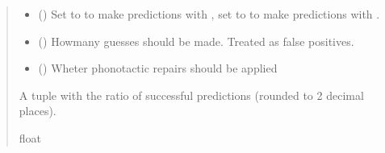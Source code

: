 \documentclass[letterpaper,10pt,english]{sphinxmanual}
\begin{document}
\begin{fulllineitems}
\begin{quote}
\begin{description}
\begin{itemize}
\item {} 
\sphinxAtStartPar
{} () \textendash{} Set to  to make predictions with
, set to  to
make predictions with
.

\item {} 
\sphinxAtStartPar
{} () \textendash{} Howmany guesses should be made. Treated as false positives.

\item {} 
\sphinxAtStartPar
{} (\sphinxstyleliteralemphasis{\sphinxupquote{, }}) \textendash{} Wheter phonotactic repairs should be applied

\end{itemize}

\sphinxAtStartPar
A tuple with the ratio of successful predictions
(rounded to 2 decimal places).

\sphinxAtStartPar
float

\end{description}\end{quote}

\sphinxAtStartPar
{}


\end{fulllineitems}
\end{document}
